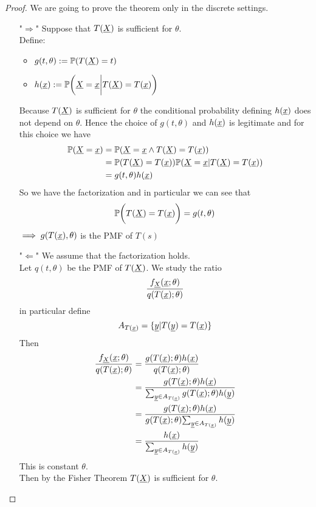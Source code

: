 \begin{proof}
	We are going to prove the theorem only in the discrete settings.\\
	\begin{itemize}
		\item["$\Rightarrow$"] Suppose that $T(\underline X)$ is sufficient for $\theta$.\\
		Define:
		\begin{itemize}
			\item $g(t,\theta):=\mathbb{P}(T(\underline X)=t)$
			\item $h(\underline x):=\mathbb{P}\bigg(\underline X=\underline x \bigg|T(\underline X)=T(\underline x)\bigg)$
		\end{itemize}
	Because $T(\underline X)$ is sufficient for $\theta$ the conditional probability defining $h(\underline x)$ does not depend on $\theta$. Hence the choice of $g(t,\theta)$ and $h(\underline x)$ is legitimate and for this choice we have
	\[
	\begin{split}
	\mathbb{P}(\underline X=\underline x)
	&=\mathbb{P}(\underline X=\underline x \wedge T(\underline X)=T(\underline x))\\
	&=\mathbb{P}(T(\underline X)=T(\underline x))\mathbb{P}(\underline X=\underline x|T(\underline X)=T(\underline x))\\
	&=g(t,\theta)h(\underline x)
	\end{split}
	\]
	So we have the factorization and in particular we can see that
	$$\mathbb{P}\bigg(T(\underline X)=T(\underline x)\bigg)=g(t,\theta)$$
	$\implies g(T(\underline x),\theta)$ is the PMF of $T(s)$
	\item["$\Leftarrow$"] We assume that the factorization holds.\\
	Let $q(t,\theta)$ be the PMF of $T(\underline X)$. We study the ratio
	$$\frac{f_{\underline X}(\underline{x};\theta)}{q(T(\underline x);\theta)}$$
	in particular define
	$$A_{T(\underline x)}=\{\underline y | T(\underline y)= T(\underline x) \}$$
	Then 
	\[
	\begin{split}
	\frac{f_{\underline X}(\underline{x};\theta)}{q(T(\underline x);\theta)}
	&=\frac{g(T(\underline x);\theta)h(\underline x)}{q(T(\underline x);\theta)}\\
	&=\frac{g(T(\underline x);\theta)h(\underline x)}{\sum_{\underline y \in A_{T(\underline x)}}{g(T(\underline x);\theta)h(\underline y)}}\\
	&=\frac{g(T(\underline x);\theta)h(\underline x)}{g(T(\underline x);\theta) {\sum_{\underline y \in A_{T(\underline x)}}h(\underline y)}}\\
	&=\frac{h(\underline x)}{\sum_{\underline y \in A_{T(\underline x)}}h(\underline y)}
	\end{split}
	\]
	This is constant \wrt $\theta$.\\
	Then by the Fisher Theorem $T(\underline X)$ is sufficient for $\theta$.
	\end{itemize}

\end{proof}

